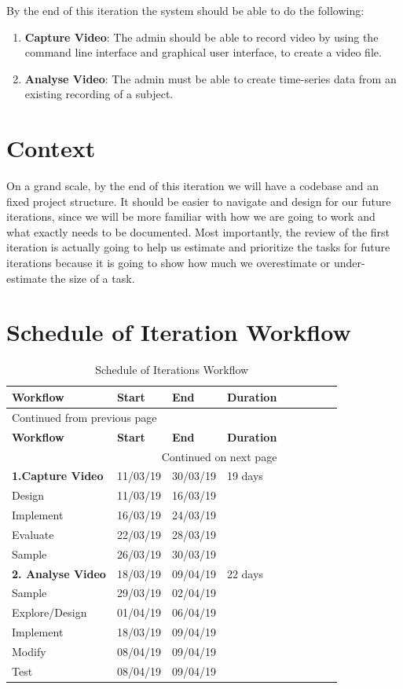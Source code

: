 \documentclass[12pt,a4paper,man]{report}
\begin{document}
By the end of this iteration the system should be able to do the following:
\begin{enumerate}
\item \textbf{Capture Video}: The admin should be able to record video by using the command line interface and graphical user interface, to create a video file.
\item \textbf{Analyse Video}: The admin must be able to create time-series data from an existing recording of a subject.
\end{enumerate}


\section{Context}
\label{sec:org1adc169}
On a grand scale, by the end of this iteration we will have a codebase and an fixed project structure. It should be easier to navigate and design for our future iterations, since we will be more familiar with how we are going to work and what exactly needs to be documented. Most importantly, the review of the first iteration is actually going to help us estimate and prioritize the tasks for future iterations because it is going to show how much we overestimate or under-estimate the size of a task.

\section{Schedule of Iteration Workflow}
\label{sec:org663ab4a}
\begin{longtable}{|l|l|l|l|l|l|l|lp{3cm}|}
\caption{\label{table:iterwork}
Schedule of Iterations Workflow}
\\
\hline
\textbf{Workflow} & \textbf{Start} & \textbf{End} & \textbf{Duration}\\
\hline
\endfirsthead
\multicolumn{4}{l}{Continued from previous page} \\
\hline

\textbf{Workflow} & \textbf{Start} & \textbf{End} & \textbf{Duration} \\

\hline
\endhead
\hline\multicolumn{4}{r}{Continued on next page} \\
\endfoot
\endlastfoot
\hline
\textbf{1.Capture Video} & 11/03/19 & 30/03/19 & 19 days\\
Design & 11/03/19 & 16/03/19 & \\
Implement & 16/03/19 & 24/03/19 & \\
Evaluate & 22/03/19 & 28/03/19 & \\
Sample & 26/03/19 & 30/03/19 & \\
\hline
\textbf{2. Analyse Video} & 18/03/19 & 09/04/19 & 22 days\\
Sample & 29/03/19 & 02/04/19 & \\
Explore/Design & 01/04/19 & 06/04/19 & \\
Implement & 18/03/19 & 09/04/19 & \\
Modify & 08/04/19 & 09/04/19 & \\
Test & 08/04/19 & 09/04/19 & \\
\hline
\end{longtable}
\end{document}
